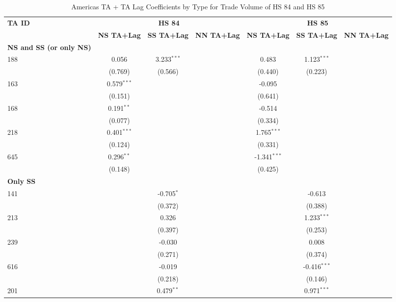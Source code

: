 \begin{table}[htbp]
    \centering
    \caption{Americas TA + TA Lag Coefficients by Type for Trade Volume of HS 84 and HS 85}
    \label{tab:HS_trade_americas_pta}
    \begin{adjustbox}{max width=\textwidth}
    \begin{tabular}{lcccccc}
    \hline
    \textbf{TA ID} & \multicolumn{3}{c}{\textbf{HS 84}} & \multicolumn{3}{c}{\textbf{HS 85}} \\
    & \textbf{NS TA+Lag} & \textbf{SS TA+Lag} & \textbf{NN TA+Lag} & \textbf{NS TA+Lag} & \textbf{SS TA+Lag} & \textbf{NN TA+Lag} \\
    \hline
    \textbf{NS and SS (or only NS)} &  &  &  &  &  &  \\
    \hline
    188 & 0.056 & 3.233$^{\ast\ast\ast}$ &  & 0.483 & 1.123$^{\ast\ast\ast}$ &  \\
    & (0.769) & (0.566) &  & (0.440) & (0.223) &  \\
    163 & 0.579$^{\ast\ast\ast}$ &  &  & -0.095 &  &  \\
     & (0.151) &  &  & (0.641) &  &  \\
    168 & 0.191$^{\ast\ast}$ &  &  & -0.514 &  &  \\
     & (0.077) &  &  & (0.334) &  &  \\
    218 & 0.401$^{\ast\ast\ast}$ &  &  & 1.765$^{\ast\ast\ast}$ &  &  \\
     & (0.124) &  &  & (0.331) &  &  \\
    645 & 0.296$^{\ast\ast}$ &  &  & -1.341$^{\ast\ast\ast}$ &  &  \\
     & (0.148) &  &  & (0.425) &  &  \\
    \hline
    \textbf{Only SS} &  &  &  &  &  &  \\
    \hline
    141 &  & -0.705$^{\ast}$ &  &  & -0.613 &  \\
     &  & (0.372) &  &  & (0.388) &  \\
    213 &  & 0.326 &  &  & 1.233$^{\ast\ast\ast}$ &  \\
     &  & (0.397) &  &  & (0.253) &  \\
    239 &  & -0.030 &  &  & 0.008 &  \\
     &  & (0.271) &  &  & (0.374) &  \\
    616 &  & -0.019 &  &  & -0.416$^{\ast\ast\ast}$ &  \\
     &  & (0.218) &  &  & (0.146) &  \\
    201 &  & 0.479$^{\ast\ast}$ &  &  & 0.971$^{\ast\ast\ast}$ &  \\

\end{tabular}
\end{adjustbox}
\end{table}
